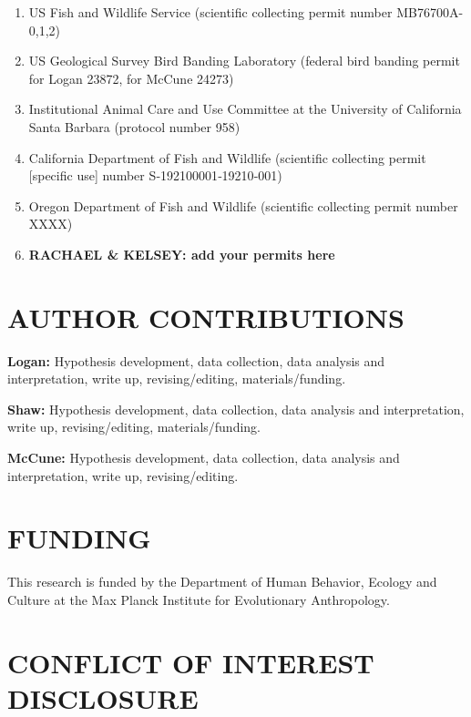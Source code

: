 \documentclass[
]{article}
\providecommand{\tightlist}{%
  \setlength{\itemsep}{0pt}\setlength{\parskip}{0pt}}
\begin{document}
\begin{enumerate}
\def\labelenumi{\arabic{enumi})}
\tightlist
\item
  US Fish and Wildlife Service (scientific collecting permit number
  MB76700A-0,1,2)
\item
  US Geological Survey Bird Banding Laboratory (federal bird banding
  permit for Logan 23872, for McCune 24273)
\item
  Institutional Animal Care and Use Committee at the University of
  California Santa Barbara (protocol number 958)
\item
  California Department of Fish and Wildlife (scientific collecting
  permit {[}specific use{]} number S‐192100001‐19210‐001)
\item
  Oregon Department of Fish and Wildlife (scientific collecting permit
  number XXXX)
\item
  \textbf{RACHAEL \& KELSEY: add your permits here}
\end{enumerate}

\hypertarget{author-contributions}{%
\section{AUTHOR CONTRIBUTIONS}\label{author-contributions}}

\textbf{Logan:} Hypothesis development, data collection, data analysis
and interpretation, write up, revising/editing, materials/funding.

\textbf{Shaw:} Hypothesis development, data collection, data analysis
and interpretation, write up, revising/editing, materials/funding.

\textbf{McCune:} Hypothesis development, data collection, data analysis
and interpretation, write up, revising/editing.

\hypertarget{funding}{%
\section{FUNDING}\label{funding}}

This research is funded by the Department of Human Behavior, Ecology and
Culture at the Max Planck Institute for Evolutionary Anthropology.

\hypertarget{conflict-of-interest-disclosure}{%
\section{CONFLICT OF INTEREST
DISCLOSURE}\label{conflict-of-interest-disclosure}}
\end{document}
